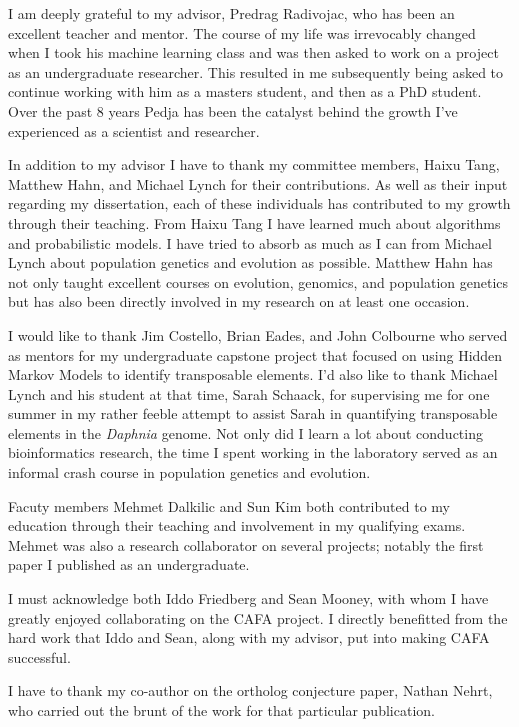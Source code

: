 \begin{acknowledgements}


I am deeply grateful to my advisor, Predrag Radivojac, who has been an excellent teacher and mentor.  The course of my life was irrevocably changed when I took his machine learning class and was then asked to work on a project as an undergraduate researcher. This resulted in me subsequently being asked to continue working with him as a masters student, and then as a PhD student.  Over the past 8 years Pedja has been the catalyst behind the growth I've experienced as a scientist and researcher.

In addition to my advisor I have to thank my committee members, Haixu Tang, Matthew Hahn, and Michael Lynch for their contributions.  As well as their input regarding my dissertation, each of these individuals has contributed to my growth through their teaching.  From Haixu Tang I have learned much about algorithms and probabilistic models.  I have tried to absorb as much as I can from Michael Lynch about population genetics and evolution as possible. Matthew Hahn has not only taught excellent courses on evolution, genomics, and population genetics but has also been directly involved in my research on at least one occasion.

I would like to thank Jim Costello, Brian Eades, and John Colbourne who served as mentors for my undergraduate capstone project that focused on using Hidden Markov Models to identify transposable elements.  I'd also like to thank Michael Lynch and his student at that time, Sarah Schaack, for supervising me for one summer in my rather feeble attempt to assist Sarah in quantifying transposable elements in the \emph{Daphnia} genome.  Not only did I learn a lot about conducting bioinformatics research, the time I spent working in the laboratory served as an informal crash course in population genetics and evolution.

Facuty members Mehmet Dalkilic and Sun Kim both contributed to my education through their teaching and involvement in my qualifying exams.  Mehmet was also a research collaborator on several projects; notably the first paper I published as an undergraduate.

I must acknowledge both Iddo Friedberg and Sean Mooney, with whom I have greatly enjoyed collaborating on the CAFA project. I directly benefitted from the hard work that Iddo and Sean, along with my advisor, put into making CAFA successful.


I have to thank my co-author on the ortholog conjecture paper, Nathan Nehrt, who carried out the brunt of the work for that particular publication. 


\end{acknowledgements}
